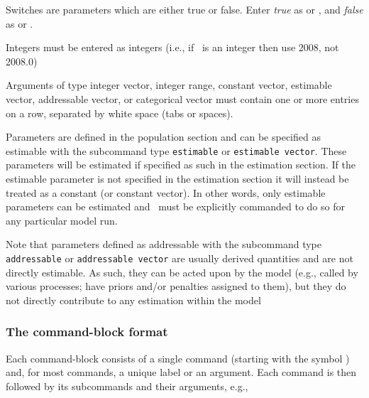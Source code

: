 Switches are parameters which are either true or false. Enter \emph{true} as  or , and \emph{false} as  or . 

Integers must be entered as integers (i.e., if \ is an integer then use 2008, not 2008.0)

Arguments of type integer vector, integer range, constant vector, estimable vector, addressable vector, or categorical vector must contain one or more entries on a row, separated by white space (tabs or spaces). 

Parameters are defined in the population section and can be specified as estimable with the subcommand type \texttt{estimable} or \texttt{estimable vector}.  These parameters will be estimated if specified as such in the estimation section. If the estimable parameter is not specified in the estimation section it will instead be treated as a constant (or constant vector). In other words, only estimable parameters can be estimated and \CNAME\ must be explicitly commanded to do so for any particular model run. 

Note that parameters defined as addressable with the subcommand type \texttt{addressable} or \texttt{addressable vector} are usually derived quantities and are not directly estimable. As such, they can be acted upon by the model (e.g., called by various processes; have priors and/or penalties assigned to them), but they do not directly contribute to any estimation within the model

\subsubsection{The command-block format}
Each command-block consists of a single command (starting with the symbol \command{}) and, for most commands, a unique label or an argument. Each command is then followed by its subcommands and their arguments, e.g., 

